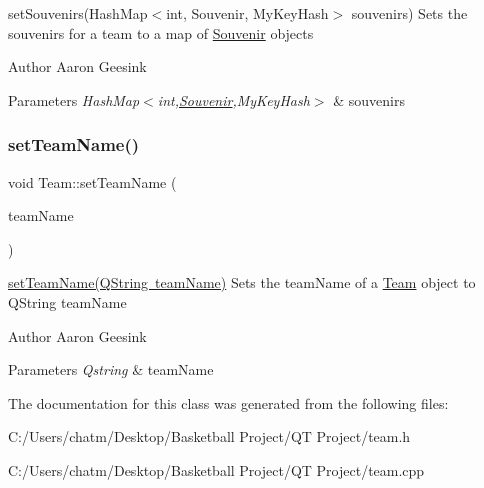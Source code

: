 set\+Souvenirs(\+Hash\+Map$<$int, Souvenir, My\+Key\+Hash$>$ souvenirs) Sets the souvenirs for a team to a map of \mbox{\hyperlink{class_souvenir}{Souvenir}} objects 

\begin{DoxyAuthor}{Author}
Aaron Geesink 
\end{DoxyAuthor}

\begin{DoxyParams}{Parameters}
{\em Hash\+Map$<$int,\mbox{\hyperlink{class_souvenir}{Souvenir}},My\+Key\+Hash$>$} & souvenirs \\
\hline
\end{DoxyParams}
\mbox{\label{class_team_a1ea161f9bcc465d45a8ca2603590739e}} 
\subsubsection{\texorpdfstring{setTeamName()}{setTeamName()}}
{\footnotesize\ttfamily void Team\+::set\+Team\+Name (\begin{DoxyParamCaption}\item[{Q\+String}]{team\+Name }\end{DoxyParamCaption})}



\mbox{\hyperlink{class_team_a1ea161f9bcc465d45a8ca2603590739e}{set\+Team\+Name(\+Q\+String team\+Name)}} Sets the team\+Name of a \mbox{\hyperlink{class_team}{Team}} object to Q\+String team\+Name 

\begin{DoxyAuthor}{Author}
Aaron Geesink 
\end{DoxyAuthor}

\begin{DoxyParams}{Parameters}
{\em Qstring} & team\+Name \\
\hline
\end{DoxyParams}


The documentation for this class was generated from the following files\+:\begin{DoxyCompactItemize}
\item 
C\+:/\+Users/chatm/\+Desktop/\+Basketball Project/\+Q\+T Project/team.\+h\item 
C\+:/\+Users/chatm/\+Desktop/\+Basketball Project/\+Q\+T Project/team.\+cpp\end{DoxyCompactItemize}
